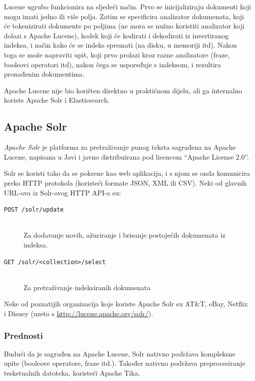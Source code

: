 \documentclass[a4paper,twoside,12pt]{scrreprt}
\begin{document}
Lucene ugrubo funkcionira na sljedeći način. Prvo se inicijaliziraju dokumenti koji mogu imati jedno ili više polja. Zatim se specificira analizator dokumenata, koji će tokenizirati dokumente po poljima (ne mora se nužno koristiti analizator koji dolazi s Apache Lucene), kodek koji će kodirati i dekodirati iz invertiranog indeksa, i način kako će se indeks spremati (na disku, u memoriji itd). Nakon toga se može napraviti upit, koji prvo prolazi kroz razne analizatore (fraze, booleovi operatori itd), nakon čega se uspoređuje s indeksom, i rezultira pronađenim dokumentima.

Apache Lucene nije bio korišten direktno u praktičnom dijelu, ali ga internalno koriste Apache Solr i Elasticsearch.

\subsection{Apache Solr}

\textit{Apache Solr} je platforma za pretraživanje punog teksta sagrađena na Apache Lucene, napisana u Javi i javno distribuirana pod licencom ``Apache License 2.0''.

Solr se koristi tako da se pokrene kao web aplikacija, i s njom se onda komunicira preko HTTP protokola (koristeći formate JSON, XML ili CSV). Neki od glavnih URL-ova iz Solr-ovog HTTP API-a su:

\begin{description}
  \item[\texttt{POST /solr/update}] \hfill \\ Za dodavanje novih, ažuriranje i brisanje postojećih dokumenata iz indeksa.
  \item[\texttt{GET /solr/<collection>/select}] \hfill \\ Za pretraživanje indeksiranih dokumenata
\end{description}

Neke od poznatijih organizacija koje koriste Apache Solr su AT\&T, eBay, Netflix i Disney (uzeto s \url{http://lucene.apache.org/solr/}).

\subsubsection{Prednosti}

Budući da je sagrađen na Apache Lucene, Solr nativno podržava kompleksne upite (booleove operatore, fraze itd.). Također nativno podržava preprocesiranje teskstualnih datoteka, koristeći Apache Tika.
\end{document}
